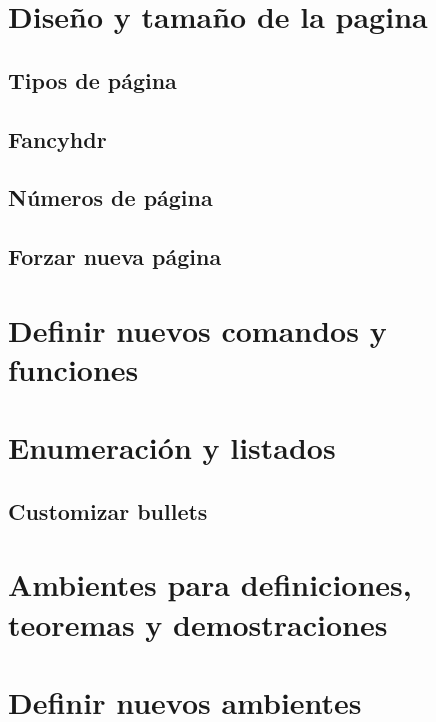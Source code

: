 \documentclass[../notes.tex]{subfiles}
\begin{document}
    \section{Diseño y tamaño de la pagina}
    
        \subsection{Tipos de página}
        \subsection{Fancyhdr}
        \subsection{Números de página}
        \subsection{Forzar nueva página}
        
    \section{Definir nuevos comandos y funciones}
    
    \section{Enumeración y listados}
        \subsection{Customizar bullets}
        
    \section{Ambientes para definiciones, teoremas y demostraciones}
    
    \section{Definir nuevos ambientes}
    
\end{document}
